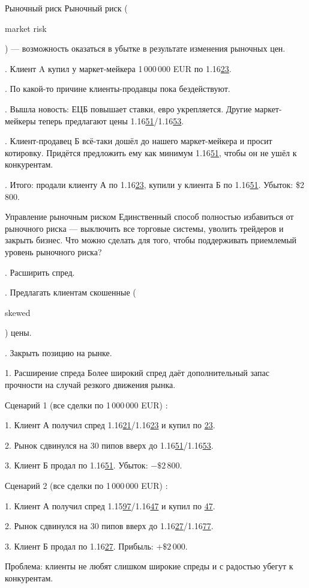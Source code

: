 \documentclass{beamer}
\newcommand{\en}[1]{\begin{otherlanguage}{english}#1\end{otherlanguage}}
\newcommand{\eurusdBigFigures}{1.16}
\newcommand{\eurusdBigFiguresMinusOne}{1.15}
\begin{document}
\begin{frame}{Рыночный риск}
\justify
\alert{Рыночный риск} (\en{market risk}) --- возможность оказаться в убытке в результате изменения рыночных цен.

. Клиент A купил у маркет-мейкера 1\,000\,000 EUR по \eurusdBigFigures\underline{23}.

. По какой-то причине клиенты-продавцы пока бездействуют.

. Вышла новость: ЕЦБ повышает ставки, евро укрепляется. Другие маркет-мейкеры теперь предлагают цены \eurusdBigFigures\underline{51}/\eurusdBigFigures\underline{53}.

. Клиент-продавец Б всё-таки дошёл до нашего маркет-мейкера и просит котировку.
Придётся предложить ему как минимум \eurusdBigFigures\underline{51}, чтобы он не ушёл к конкурентам.

. Итого: продали клиенту А по \eurusdBigFigures\underline{23}, купили у клиента Б по
\eurusdBigFigures\underline{51}. Убыток: \$2\,800.
\end{frame}



\begin{frame}{Управление рыночным риском}
\justify
Единственный способ полностью избавиться от рыночного риска --- выключить 
все торговые системы, уволить трейдеров и закрыть бизнес. Что можно сделать
для того, чтобы поддерживать приемлемый уровень рыночного риска?

. Расширить спред.

. Предлагать клиентам скошенные (\en{skewed}) цены.

. Закрыть позицию на рынке.
\end{frame}



\begin{frame}{1. Расширение спреда}
\justify
Более широкий спред даёт дополнительный запас прочности на случай резкого
движения рынка.

\justify
Сценарий 1 (все сделки по 1\,000\,000 EUR) :

1. Клиент А получил спред \eurusdBigFigures\underline{21}/\eurusdBigFigures\underline{23} и купил по \underline{23}.

2. Рынок сдвинулся на 30 пипов вверх до \eurusdBigFigures\underline{51}/\eurusdBigFigures\underline{53}.

3. Клиент Б продал по \eurusdBigFigures\underline{51}. Убыток: $-\$2\,800$.

\justify
Сценарий 2 (все сделки по 1\,000\,000 EUR) :

1. Клиент А получил спред \eurusdBigFiguresMinusOne\underline{97}/\eurusdBigFigures\underline{47} и купил по \underline{47}.

2. Рынок сдвинулся на 30 пипов вверх до \eurusdBigFigures\underline{27}/\eurusdBigFigures\underline{77}.

3. Клиент Б продал по \eurusdBigFigures\underline{27}. Прибыль: $+\$2\,000$.

\justify
Проблема: клиенты не любят слишком широкие спреды и с радостью убегут к 
конкурентам.
\end{frame}
\end{document}
